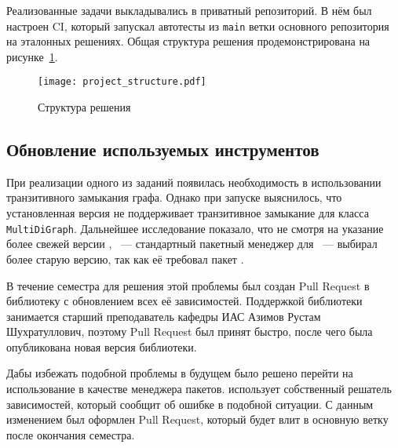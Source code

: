 Реализованные задачи выкладывались в приватный репозиторий.
В нём был настроен CI, который запускал автотесты из \texttt{main} ветки основного репозитория на эталонных решениях.
Общая структура решения продемонстрирована на рисунке~\ref{fig:structure}.

\begin{figure}[h]
    \caption{Структура решения}
    \label{fig:structure}
    \texttt{[image: project\_structure.pdf]}
\end{figure}

\subsection{Обновление используемых инструментов}
\label{subsec:housekeeping}

При реализации одного из заданий появилась необходимость в использовании транзитивного замыкания графа.
Однако при запуске выяснилось, что установленная версия \networkx{} не поддерживает транзитивное замыкание для класса \texttt{MultiDiGraph}.
Дальнейшее исследование показало, что не смотря на указание более свежей версии \networkx{}, \pip{}~--- стандартный пакетный менеджер для \python{}~--- выбирал более старую версию, так как её требовал пакет \cfpqdata{}.

В течение семестра для решения этой проблемы был создан Pull Request в библиотеку \cfpqdata{} с обновлением всех её зависимостей.
Поддержкой библиотеки занимается старший преподаватель кафедры ИАС Азимов Рустам Шухратуллович, поэтому Pull Request был принят быстро, после чего была опубликована новая версия библиотеки.

Дабы избежать подобной проблемы в будущем было решено перейти на использование \poetry{} в качестве менеджера пакетов.
\poetry{} использует собственный решатель зависимостей, который сообщит об ошибке в подобной ситуации.
С данным изменением был оформлен Pull Request, который будет влит в основную ветку после окончания семестра.
